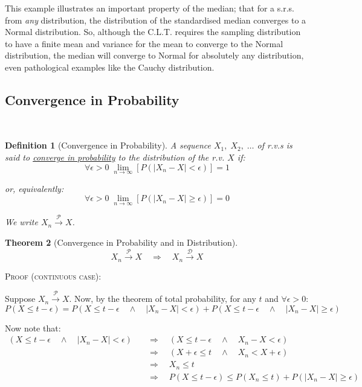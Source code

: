 \documentclass[12pt,a4paper]{article}
\newcommand{\imply}{\quad\Rightarrow\quad}
\newcommand{\AND}{\quad\wedge\quad}
\newtheorem{thm}{Theorem}[subsection]
\newtheorem{defn}[thm]{Definition}
\begin{document}
This example illustrates an important property of the median; that for a s.r.s. from \emph{any} distribution, the distribution of the standardised median converges to a Normal distribution. So, although the C.L.T. requires the sampling distribution to have a finite mean and variance for the mean to converge to the Normal distribution, the median will converge to Normal for absolutely any distribution, even pathological examples like the Cauchy distribution.

\subsection{Convergence in Probability}$\;$

\begin{defn}[Convergence in Probability]\vspace{1cm}

A sequence $X_1,\;X_2,\;\hdots$ of r.v.s is said to \underline{converge in probability} to the distribution of the r.v. $X$ if:
$$\forall\epsilon>0\;\lim_{n\to\infty} \left[P\left(\left|X_n-X\right|<\epsilon\right)\right] = 1$$

or, equivalently:
$$\forall\epsilon >0\;\lim_{n\to\infty}\left[P\left(\left|X_n-X\right|\geq\epsilon\right)\right] = 0$$

We write $X_n \xrightarrow{\mathscr{P}} X$.

\end{defn}

\begin{thm}[Convergence in Probability and in Distribution]\vspace{1cm}

$$X_n\xrightarrow{\mathscr{P}} X \quad\Rightarrow\quad X_n\xrightarrow{\mathscr{D}} X$$

\end{thm}

\noindent\textsc{Proof (continuous case):}\par\vspace{1cm}

Suppose $X_n \xrightarrow{\mathscr{P}}X$. Now, by the theorem of total probability, for any $t$ and $\forall \epsilon>0$:
$$P(X\leq t-\epsilon) = P(X\leq t-\epsilon \AND \left|X_n-X\right| < \epsilon) + P(X\leq t-\epsilon \AND\left|X_n-X\right| \geq \epsilon)$$

Now note that:
\begin{align*}
(X\leq t-\epsilon \AND \left|X_n-X\right| < \epsilon) &\imply (X\leq t-\epsilon \AND X_n-X<\epsilon)\\
&\imply (X+\epsilon\leq t \AND X_n < X + \epsilon)\\
&\imply X_n\leq t\\
&\imply P(X\leq t-\epsilon)\leq P(X_n\leq t) + P(\left|X_n-X\right|\geq \epsilon)
\end{align*}
\end{document}
